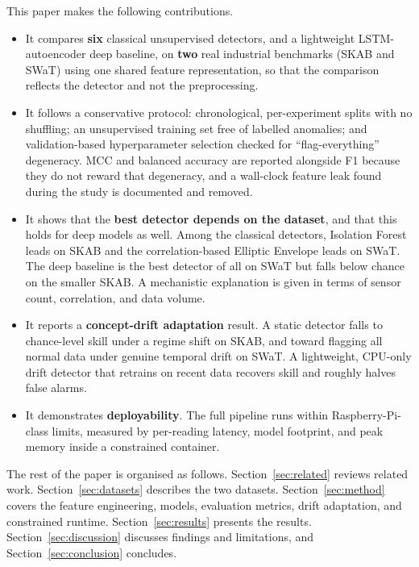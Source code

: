 \documentclass[runningheads]{llncs}
\begin{document}
This paper makes the following contributions.
\begin{itemize}
\item It compares \textbf{six} classical unsupervised detectors, and a
lightweight LSTM-autoencoder deep baseline, on \textbf{two} real industrial
benchmarks (SKAB and SWaT) using one shared feature representation, so that the
comparison reflects the detector and not the preprocessing.
\item It follows a conservative protocol: chronological, per-experiment splits
with no shuffling; an unsupervised training set free of labelled anomalies; and
validation-based hyperparameter selection checked for ``flag-everything''
degeneracy. MCC and balanced accuracy are reported alongside F1 because they do
not reward that degeneracy, and a wall-clock feature leak found during the study
is documented and removed.
\item It shows that the \textbf{best detector depends on the dataset}, and that
this holds for deep models as well. Among the classical detectors, Isolation
Forest leads on SKAB and the correlation-based Elliptic Envelope leads on SWaT.
The deep baseline is the best detector of all on SWaT but falls below chance on
the smaller SKAB. A mechanistic explanation is given in terms of sensor count,
correlation, and data volume.
\item It reports a \textbf{concept-drift adaptation} result. A static detector
falls to chance-level skill under a regime shift on SKAB, and toward flagging all
normal data under genuine temporal drift on SWaT. A lightweight, CPU-only drift
detector that retrains on recent data recovers skill and roughly halves false
alarms.
\item It demonstrates \textbf{deployability}. The full pipeline runs within
Raspberry-Pi-class limits, measured by per-reading latency, model footprint, and
peak memory inside a constrained container.
\end{itemize}

The rest of the paper is organised as follows.
Section~\ref{sec:related} reviews related work. Section~\ref{sec:datasets}
describes the two datasets. Section~\ref{sec:method} covers the feature
engineering, models, evaluation metrics, drift adaptation, and constrained
runtime. Section~\ref{sec:results} presents the results.
Section~\ref{sec:discussion} discusses findings and limitations, and
Section~\ref{sec:conclusion} concludes.
\end{document}
